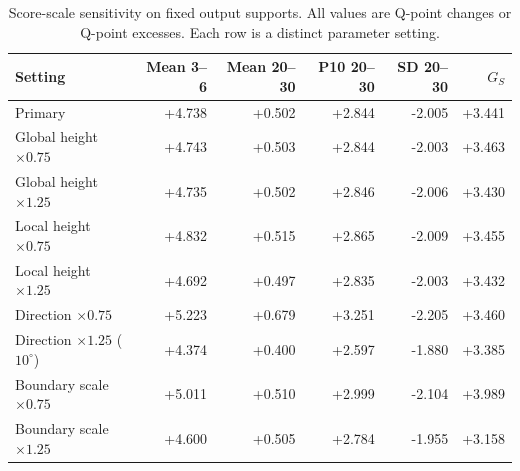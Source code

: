 \begin{table}[htbp]
\centering\small
\caption{Score-scale sensitivity on fixed output supports. All values are Q-point changes or Q-point excesses. Each row is a distinct parameter setting.}
\label{tab:score-scale-sensitivity}
\setlength{\tabcolsep}{4pt}
\begin{tabular}{@{}lrrrrr@{}}
\toprule
Setting & Mean 3--6 & Mean 20--30 & P10 20--30 & SD 20--30 & $G_S$ \\
\midrule
Primary & +4.738 & +0.502 & +2.844 & -2.005 & +3.441 \\
Global height $\times0.75$ & +4.743 & +0.503 & +2.844 & -2.003 & +3.463 \\
Global height $\times1.25$ & +4.735 & +0.502 & +2.846 & -2.006 & +3.430 \\
Local height $\times0.75$ & +4.832 & +0.515 & +2.865 & -2.009 & +3.455 \\
Local height $\times1.25$ & +4.692 & +0.497 & +2.835 & -2.003 & +3.432 \\
Direction $\times0.75$ & +5.223 & +0.679 & +3.251 & -2.205 & +3.460 \\
Direction $\times1.25$ ($10^\circ$) & +4.374 & +0.400 & +2.597 & -1.880 & +3.385 \\
Boundary scale $\times0.75$ & +5.011 & +0.510 & +2.999 & -2.104 & +3.989 \\
Boundary scale $\times1.25$ & +4.600 & +0.505 & +2.784 & -1.955 & +3.158 \\
\bottomrule
\end{tabular}
\end{table}
